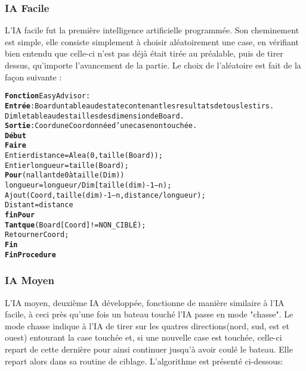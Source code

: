\subsubsection{IA Facile}
    L'IA facile fut la première intelligence artificielle programmée. Son cheminement est simple, elle consiste simplement à choisir aléatoirement une case, en vérifiant bien entendu que celle-ci n'est pas déjà était tirée au préalable, puis de tirer dessus, qu'importe l'avancement de la partie.\newline
    Le choix de l'aléatoire est fait de la façon suivante :\newline
    
\begin{alltt}
{\bf Fonction} EasyAdvisor :
	{\bf Entrée} : Board un tableau de state contenant les resultats de tous les tirs.
          Dim le tableau des tailles des dimension de Board.
    {\bf Sortie} : Coord une Coordonnée d’une case non touchée.
    {\bf Début}
        {\bf Faire}
            Entier distance = Alea(0, taille(Board)) ;
            Entier longueur = taille(Board) ;
            {\bf Pour} (n allant de 0 à taille(Dim))
                longueur = longueur / Dim[taille(dim) - 1 – n) ;
                Ajout(Coord, taille(dim) - 1 – n, distance / longueur) ;
                Distant = distance % longueur
            {\bf finPour}
        {\bf Tant que} (Board[Coord] != NON_CIBLÉ) ;
        Retourner Coord ;
    {\bf Fin}
{\bf Fin Procedure} 
\end{alltt}
        
\newpage        
        
\subsubsection{IA Moyen}
	L'IA moyen, deuxième IA développée, fonctionne de manière similaire à l'IA facile, à ceci près qu'une fois un bateau touché l'IA passe en mode "chasse".\newline
	Le mode chasse indique à l'IA de tirer sur les quatres directions(nord, sud, est et ouest) entourant la case touchée et, si une nouvelle case est touchée, celle-ci repart de cette dernière pour ainsi continuer jusqu'à avoir coulé le bateau.\newline
	Elle repart alors dans sa routine de ciblage.\newline
	L'algorithme est présenté ci-dessous:
    
